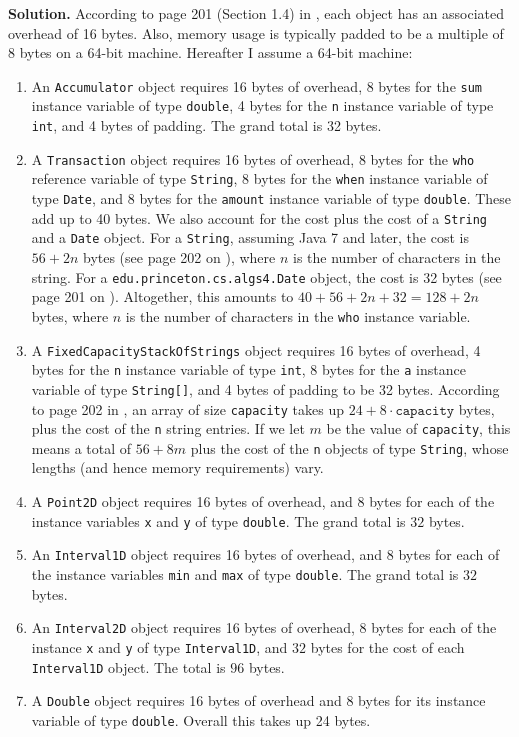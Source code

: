 \documentclass[12pt, a4paper]{article}
\newenvironment{sol}[1][Solution]
{\par\medskip\noindent \textbf{#1.} }
{\medskip}
\begin{document}
	\begin{sol}
		According to page 201 (Section 1.4) in \cite{sedgewick_wayne}, each object has
		an associated overhead of 16 bytes. Also, memory usage is typically padded to be a multiple
		of 8 bytes on a 64-bit machine. Hereafter I assume a 64-bit machine:
		\begin{enumerate}[label=(\alph*)]
			\item An \texttt{Accumulator} object requires 16 bytes of overhead, 8 bytes for the
			\texttt{sum} instance variable of type \texttt{double}, 4 bytes for the \texttt{n} instance
			variable of type \texttt{int}, and 4 bytes of padding. The grand total is 32 bytes.
			\item A \texttt{Transaction} object requires 16 bytes of overhead, 8 bytes
			for the \texttt{who} reference variable of type \texttt{String},
			8 bytes for the \texttt{when} instance variable of type \texttt{Date}, and
			8 bytes for the \texttt{amount} instance variable of type \texttt{double}.
			These add up to 40 bytes. We also account for the cost plus the cost of a \texttt{String}
			and a \texttt{Date} object. For a \texttt{String}, assuming Java 7 and later,
			the cost is $56 + 2n$ bytes (see page 202 on \cite{sedgewick_wayne}), where $n$ is
			the number of characters in the string. For a \texttt{edu.princeton.cs.algs4.Date}
			object, the cost is 32 bytes (see page 201 on \cite{sedgewick_wayne}). Altogether,
			this amounts to $40 + 56+2n + 32=128+2n$ bytes, where $n$ is the number of characters
			in the \texttt{who} instance variable.
			\item A \texttt{FixedCapacityStackOfStrings} object requires 16 bytes of overhead,
			4 bytes for the \texttt{n} instance variable of type \texttt{int}, 8 bytes for
			the \texttt{a} instance variable of type \texttt{String[]}, and 4 bytes of padding
			to be 32 bytes. According to page 202 in \cite{sedgewick_wayne}, an array of size
			\texttt{capacity} takes up $24 + 8\cdot \texttt{capacity}$ bytes, plus the cost
			of the \texttt{n} string entries. If we let $m$ be the value of \texttt{capacity},
			this means a total of $56 + 8m$ plus the cost of the \texttt{n} objects of type \texttt{String},
			whose lengths (and hence memory requirements) vary.
			\item A \texttt{Point2D} object requires 16 bytes of overhead, and 8 bytes for each
			of the instance variables \texttt{x} and \texttt{y} of type \texttt{double}. The
			grand total is $32$ bytes.
			\item An \texttt{Interval1D} object requires 16 bytes of overhead, and 8 bytes
			for each of the instance variables \texttt{min} and \texttt{max} of type \texttt{double}.
			The grand total is $32$ bytes.
			\item An \texttt{Interval2D} object requires 16 bytes of overhead, 8 bytes
			for each of the instance \texttt{x} and \texttt{y} of type \texttt{Interval1D},
			and $32$ bytes for the cost of each \texttt{Interval1D} object. The total is
			$96$ bytes.
			\item A \texttt{Double} object requires 16 bytes of overhead and 8 bytes for its instance
			variable of type \texttt{double}. Overall this takes up 24 bytes.
		\end{enumerate}
	\end{sol}
\end{document}
